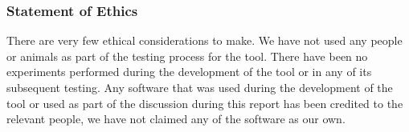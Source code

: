 \documentclass{UoYCSproject}
\begin{document}
\begin{summary}
    \subsubsection{Statement of Ethics}
    There are very few ethical considerations to make.
    We have not used any people or animals as part of the testing process for the tool.
    There have been no experiments performed during the development of the tool or in any of its subsequent testing.
    Any software that was used during the development of the tool or used as part of the discussion during this report has been credited to the relevant people, we have not claimed any of the software as our own.

    \end{summary}





\printbibliography


\end{document}
